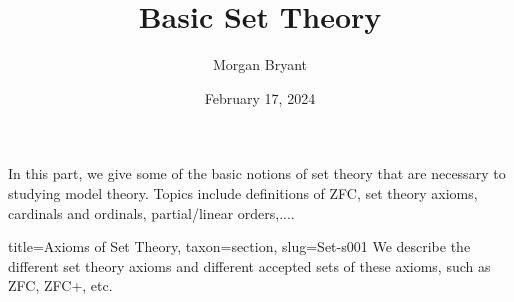 \documentclass[a4paper]{article}
\title{Basic Set Theory}
\date{February 17, 2024}
\author{Morgan Bryant}
\begin{document}
\maketitle
\par{In this part, we give some of the basic notions of set theory that are necessary to studying model theory. Topics include definitions of ZFC, set theory axioms, cardinals and ordinals, partial/linear orders,....}
\begin{tree}{title={Axioms of Set Theory}, taxon={section}, slug={Set-s001}}
We describe the different set theory axioms and different accepted sets of these axioms, such as ZFC, ZFC+, etc.
\end{tree}

\printbibliography
\end{document}
